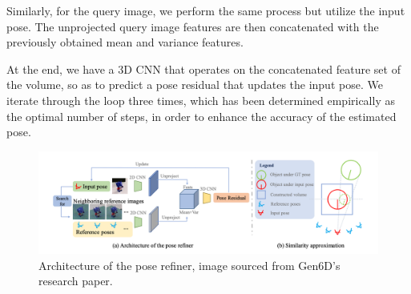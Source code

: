 Similarly, for the query image, we perform the same process but utilize the input pose. The unprojected query image features are then concatenated with the previously obtained mean and variance features.

At the end, we have a 3D \ac{CNN} that operates on the concatenated feature set of the volume, so as to predict a pose residual that updates the input pose. We iterate through the loop three times, which has been determined empirically as the optimal number of steps, in order to enhance the accuracy of the estimated pose.


\begin{figure}[ht]
  \centering
  \includegraphics[width=\textwidth]{data/gen6d4.png}
  \caption{Architecture of the pose refiner, image sourced from Gen6D's research paper.}
  \label{fig:fig3}
\end{figure}

